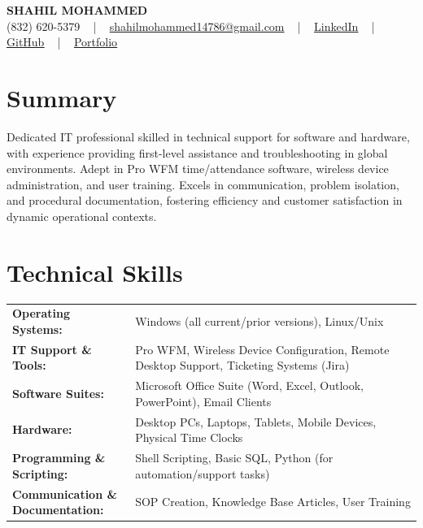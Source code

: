 \documentclass[letterpaper,11pt]{article}
\begin{document}
\begin{center}
    {\fontsize{14pt}{12pt}\selectfont \textbf{\MakeUppercase{Shahil Mohammed}}}\\ \vspace{2pt}
    \fontsize{10pt}{12pt}\selectfont (832) 620-5379 ~ | ~ \href{mailto:shahilmohammed14786@gmail.com}{shahilmohammed14786@gmail.com} ~ | ~  
    \href{https://www.linkedin.com/in/shahil-mohammed-9652931a1/}{\color{blue}\underline{LinkedIn}}  ~ | ~ 
    \href{https://github.com/freakbeast14}{\color{blue}\underline{GitHub}} ~ | ~ 
    \href{https://shahil-mohammed.netlify.app/}{\color{blue}\underline{Portfolio}}
    \vspace{-8pt}
\end{center}

\section{Summary}
\fontsize{9pt}{10pt}\selectfont
Dedicated IT professional skilled in technical support for software and hardware, with experience providing first-level assistance and troubleshooting in global environments. Adept in Pro WFM time/attendance software, wireless device administration, and user training. Excels in communication, problem isolation, and procedural documentation, fostering efficiency and customer satisfaction in dynamic operational contexts.
 \vspace{-5pt}
 
\section{Technical Skills}
        \vspace{-14pt}
        \begin{table}[h]
            \fontsize{9pt}{10pt}\selectfont
            \begin{tabular}{p{0.3\linewidth} p{0.7\linewidth}}
                \textbf{Operating Systems:} & Windows (all current/prior versions), Linux/Unix \\
                \textbf{IT Support \& Tools:} & Pro WFM, Wireless Device Configuration, Remote Desktop Support, Ticketing Systems (Jira) \\
                \textbf{Software Suites:} & Microsoft Office Suite (Word, Excel, Outlook, PowerPoint), Email Clients \\
                \textbf{Hardware:} & Desktop PCs, Laptops, Tablets, Mobile Devices, Physical Time Clocks \\
                \textbf{Programming \& Scripting:} & Shell Scripting, Basic SQL, Python (for automation/support tasks) \\
                \textbf{Communication \& Documentation:} & SOP Creation, Knowledge Base Articles, User Training \\
            \end{tabular}
        \end{table}
 \vspace{-15pt}
 
\end{document}
